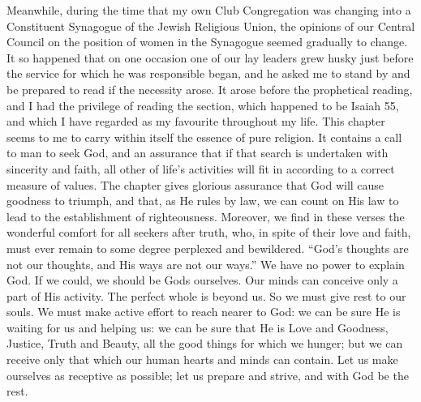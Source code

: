 Meanwhile, during the time that my own Club
Congregation was changing into a Constituent Synagogue
of the Jewish Religious Union, the opinions of our
Central Council on the position of women in the Synagogue
seemed gradually to change. It so happened that
on one occasion one of our lay leaders grew husky just
before the service for which he was responsible began,
and he asked me to stand by and be prepared to read if
the necessity arose. It arose before the prophetical
reading, and I had the privilege of reading the section,
which happened to be Isaiah 55, and which I have
regarded as my favourite throughout my life. This chapter
seems to me to carry within itself the essence of pure
religion. It contains a call to man to seek God, and an
assurance that if that search is undertaken with sincerity
and faith, all other of life’s activities will fit in according
to a correct measure of values. The chapter gives
glorious assurance that God will cause goodness to
triumph, and that, as He rules by law, we can
count on His law to lead to the establishment of righteousness.
Moreover, we find in these verses the wonderful
comfort for all seekers after truth, who, in spite of their
love and faith, must ever remain to some degree perplexed
and bewildered. “God’s thoughts are not our thoughts,
and His ways are not our ways.” We have no power to
explain God. If we could, we should be Gods ourselves.
Our minds can conceive only a part of His activity. The
perfect whole is beyond us. So we must give rest to our
souls. We must make active effort to reach nearer to
God: we can be sure He is waiting for us and helping us:
we can be sure that He is Love and Goodness, Justice,
Truth and Beauty, all the good things for which we
hunger; but we can receive only that which our human
hearts and minds can contain. Let us make ourselves
as receptive as possible; let us prepare and strive, and
with God be the rest.

